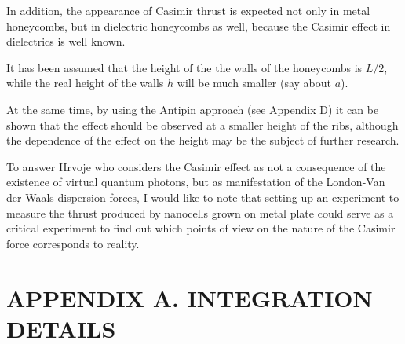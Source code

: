 \documentclass[twoside, 10pt, ptm]{article}
\begin{document}
\begin{multicols}{2}
    In addition, the appearance of Casimir thrust is expected not only in metal honeycombs,
but in dielectric honeycombs as well, because the Casimir effect in dielectrics
is well known.

    It has been assumed that the height of the the walls of the honeycombs is \(L/2\),
while the real height of the walls \(h\) will be much smaller (say about \(a\)).

    At the same time, by using the Antipin approach (see Appendix D) it can be
shown that the effect should be observed at a smaller height of the
ribs, although the dependence of the effect on the height may be the
subject of further research.

    To answer Hrvoje \cite{Hrvoje2016} who considers the Casimir
effect as not a consequence of the existence of virtual quantum photons,
but as manifestation of the London-Van der Waals dispersion
forces, I would like to note that setting up an experiment to measure the thrust
produced by nanocells grown on metal plate could serve as a critical
experiment to find out which points of view on the nature of the
Casimir force corresponds to reality.

\end{multicols}

    \section*{\centering\uppercase{Appendix A. Integration details}}\label{appendix-a.-integration-details}
\vspace{-3.5mm}
\end{document}
